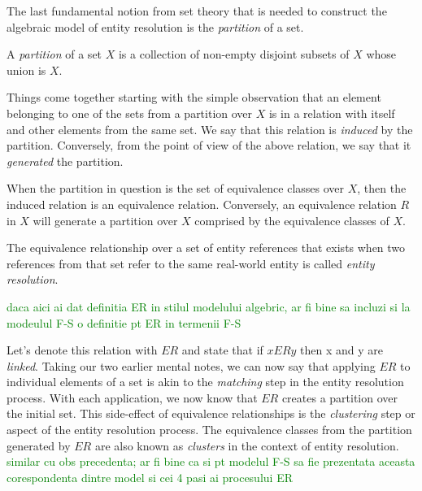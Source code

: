 \documentclass[journal]{IEEEtran}
\begin{document}
    The last fundamental notion from set theory that is needed to construct the
    algebraic model of entity resolution is the \textit{partition} of a set.

    \begin{defn}
        A \textit{partition} of a set $X$ is a collection of non-empty disjoint
        subsets of $X$ whose union is $X$\cite{halmos1960naive,Tal11}.
    \end{defn}

    Things come together starting with the simple observation that an element
    belonging to one of the sets from a partition over $X$ is in a relation with
    itself and other elements from the same set.
    We say that this relation is \textit{induced} by the partition.
    Conversely, from the point of view of the above relation, we say that it
    \textit{generated} the partition.

    When the partition in question is the set of equivalence classes over $X$,
    then the induced relation is an equivalence relation.
    Conversely, an equivalence relation $R$ in $X$ will generate a partition
    over $X$ comprised by the equivalence classes of $X$\cite{halmos1960naive,
    Tal11}.

    \begin{defn}
        The equivalence relationship over a set of entity references that exists
        when two references from that set refer to the same real-world entity is
        called \textit{entity resolution}.
    \end{defn}
    \textcolor{green}{daca aici ai dat definitia ER in stilul modelului algebric, ar fi bine sa incluzi si la modeulul F-S o definitie pt ER in termenii F-S}



    Let's denote this relation with $ER$ and state that if $xERy$ then x and y
    are \textit{linked}\cite{Tal11}.
    Taking our two earlier mental notes, we can now say that applying $ER$ to
    individual elements of a set is akin to the \textit{matching} step in the
    entity resolution process.
    With each application, we now know that $ER$ creates a partition over the
    initial set.
    This side-effect of equivalence relationships is the \textit{clustering}
    step or aspect of the entity resolution process.
    The equivalence classes from the partition generated by $ER$ are also known
    as \textit{clusters} in the context of entity resolution.
    \textcolor{green}{similar cu obs precedenta; ar fi bine ca si pt modelul F-S sa fie prezentata aceasta corespondenta dintre model si cei 4 pasi ai procesului ER}
\end{document}
